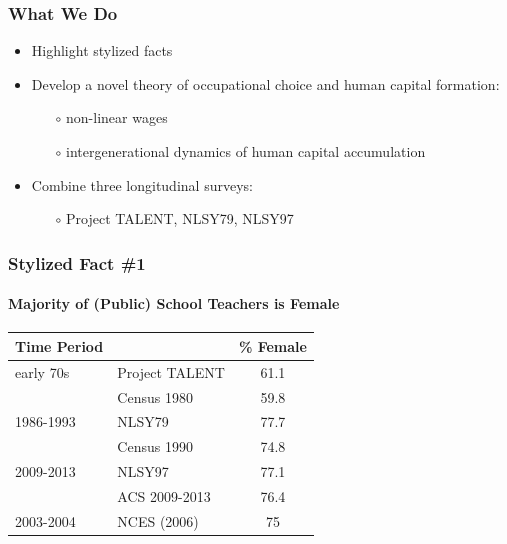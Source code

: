 \documentclass[11pt]{beamer}
\begin{document}
	\begin{frame}
		\frametitle{What We Do}
		\vfill
		\begin{itemize}
			\item Highlight stylized facts
			\vfill
			\item Develop a novel theory of occupational choice and human capital formation: 
			\begin{itemize}
				\item[$\circ$] non-linear wages %
				\item[$\circ$] intergenerational dynamics of human capital accumulation
			\end{itemize}
			\vfill
			\item Combine three longitudinal surveys: 
			\begin{itemize}
				\item[$\circ$] Project TALENT, NLSY79, NLSY97
            \end{itemize}
		\end{itemize}
		\vfill
	\end{frame}


	\begin{frame}
		\frametitle{Stylized Fact \#1}
		\framesubtitle{Majority of (Public) School Teachers is Female}
		\begin{table}[h!]
			\centering 
			\begin{tabular}{l l c }
				\toprule
				Time Period & & \% Female \\
				\midrule
                early 70s & Project TALENT  &  61.1 \\
                & Census 1980 &  59.8 \\
                1986-1993 & NLSY79  & 77.7   \\
                & Census 1990 & 74.8 \\
                2009-2013& NLSY97  & 77.1   \\
                & ACS 2009-2013  & 76.4  \\
				\midrule
				2003-2004 & NCES (2006) & 75\\
				\bottomrule
			\end{tabular}
		\end{table}
	\end{frame}
	
\end{document}
